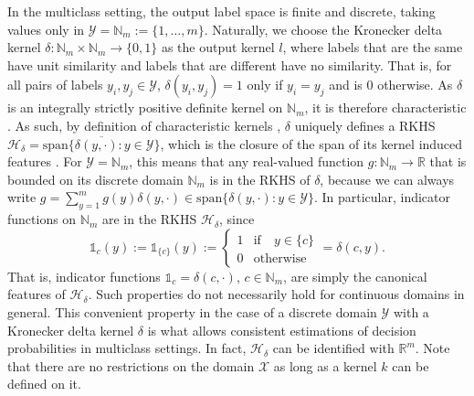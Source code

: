 \documentclass[twoside]{article}
\begin{document}
		In the multiclass setting, the output label space is finite and discrete, taking values only in $\mathcal{Y} = \mathbb{N}_{m} := \{1, \dots, m\}$. Naturally, we choose the Kronecker delta kernel $\delta : \mathbb{N}_{m} \times \mathbb{N}_{m} \to \{0, 1\}$ as the output kernel $l$, where labels that are the same have unit similarity and labels that are different have no similarity. That is, for all pairs of labels $y_{i}, y_{j} \in \mathcal{Y}$, $\delta(y_{i}, y_{j}) = 1$ only if $y_{i} = y_{j}$ and is $0$ otherwise. As $\delta$ is an integrally strictly positive definite kernel on $\mathbb{N}_{m}$, it is therefore characteristic \citep[Theorem 7]{sriperumbudur2010hilbert}. As such, by definition of characteristic kernels \citep{fukumizu2004dimensionality}, $\delta$ uniquely defines a RKHS  $\mathcal{H}_{\delta} = \overline{\mathrm{span}\{\delta(y, \cdot) : y \in \mathcal{Y}\}}$, which is the closure of the span of its kernel induced features \citep{xu2009refinement}. For $\mathcal{Y} = \mathbb{N}_{m}$, this means that any real-valued function $g : \mathbb{N}_{m} \to \mathbb{R}$ that is bounded on its discrete domain $\mathbb{N}_{m}$ is in the RKHS of $\delta$, because we can always write $g = \sum_{y = 1}^{m} g(y) \delta(y, \cdot) \in \mathrm{span}\{\delta(y, \cdot) : y \in \mathcal{Y}\}$. In particular, indicator functions on $\mathbb{N}_{m}$ are in the RKHS $\mathcal{H}_{\delta}$, since
		\begin{equation}
		\mathbb{1}_{c}(y) := \mathbb{1}_{\{c\}}(y) := \begin{cases}
		1 & \mathrm{if } \quad y \in \{c\} \\
		0 & \mathrm{otherwise}
		\end{cases} = \delta(c, y).
		\label{eq:indicator_function}
		\end{equation}
		That is, indicator functions $\mathbb{1}_{c} = \delta(c, \cdot)$, $c \in \mathbb{N}_{m}$, are simply the canonical features of $\mathcal{H}_{\delta}$. Such properties do not necessarily hold for continuous domains in general. This convenient property in the case of a discrete domain $\mathcal{Y}$ with a Kronecker delta kernel $\delta$ is what allows consistent estimations of decision probabilities in multiclass settings. In fact, $\mathcal{H}_{\delta}$ can be identified with $\mathbb{R}^{m}$. Note that there are no restrictions on the domain $\mathcal{X}$ as long as a kernel $k$ can be defined on it.
		
\end{document}
